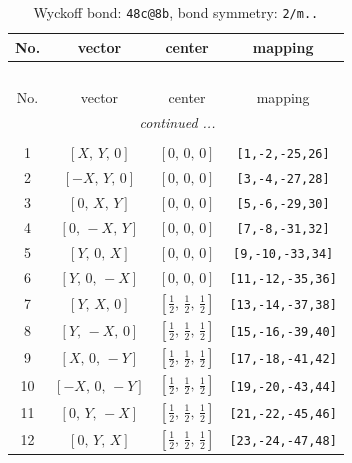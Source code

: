 \documentclass[fleqn,8pt]{jsarticle}
\begin{document}
\begin{longtable}{cccc}
\caption{Wyckoff bond: {\tt 48c@8b}, bond symmetry: {\tt 2/m..}}
 \\
 \hline \hline
No. & vector & center & mapping \\ \hline \endfirsthead

\multicolumn{3}{l}{\tablename\ \thetable{}} \\
 \hline \hline
No. & vector & center & mapping \\ \hline \endhead

 \hline \hline
\multicolumn{3}{r}{\footnotesize\it continued ...} \\ \endfoot

 \hline \hline
\multicolumn{3}{r}{} \\ \endlastfoot

1 & $\left[ X,\, Y,\, 0 \right]$ & $\left[ 0,\, 0,\, 0 \right]$ & {\tt [1,-2,-25,26]} \\ \hline
2 & $\left[ - X,\, Y,\, 0 \right]$ & $\left[ 0,\, 0,\, 0 \right]$ & {\tt [3,-4,-27,28]} \\ \hline
3 & $\left[ 0,\, X,\, Y \right]$ & $\left[ 0,\, 0,\, 0 \right]$ & {\tt [5,-6,-29,30]} \\ \hline
4 & $\left[ 0,\, - X,\, Y \right]$ & $\left[ 0,\, 0,\, 0 \right]$ & {\tt [7,-8,-31,32]} \\ \hline
5 & $\left[ Y,\, 0,\, X \right]$ & $\left[ 0,\, 0,\, 0 \right]$ & {\tt [9,-10,-33,34]} \\ \hline
6 & $\left[ Y,\, 0,\, - X \right]$ & $\left[ 0,\, 0,\, 0 \right]$ & {\tt [11,-12,-35,36]} \\ \hline
7 & $\left[ Y,\, X,\, 0 \right]$ & $\left[ \frac{1}{2},\, \frac{1}{2},\, \frac{1}{2} \right]$ & {\tt [13,-14,-37,38]} \\ \hline
8 & $\left[ Y,\, - X,\, 0 \right]$ & $\left[ \frac{1}{2},\, \frac{1}{2},\, \frac{1}{2} \right]$ & {\tt [15,-16,-39,40]} \\ \hline
9 & $\left[ X,\, 0,\, - Y \right]$ & $\left[ \frac{1}{2},\, \frac{1}{2},\, \frac{1}{2} \right]$ & {\tt [17,-18,-41,42]} \\ \hline
10 & $\left[ - X,\, 0,\, - Y \right]$ & $\left[ \frac{1}{2},\, \frac{1}{2},\, \frac{1}{2} \right]$ & {\tt [19,-20,-43,44]} \\ \hline
11 & $\left[ 0,\, Y,\, - X \right]$ & $\left[ \frac{1}{2},\, \frac{1}{2},\, \frac{1}{2} \right]$ & {\tt [21,-22,-45,46]} \\ \hline
12 & $\left[ 0,\, Y,\, X \right]$ & $\left[ \frac{1}{2},\, \frac{1}{2},\, \frac{1}{2} \right]$ & {\tt [23,-24,-47,48]} \\
\end{longtable}
\end{document}
